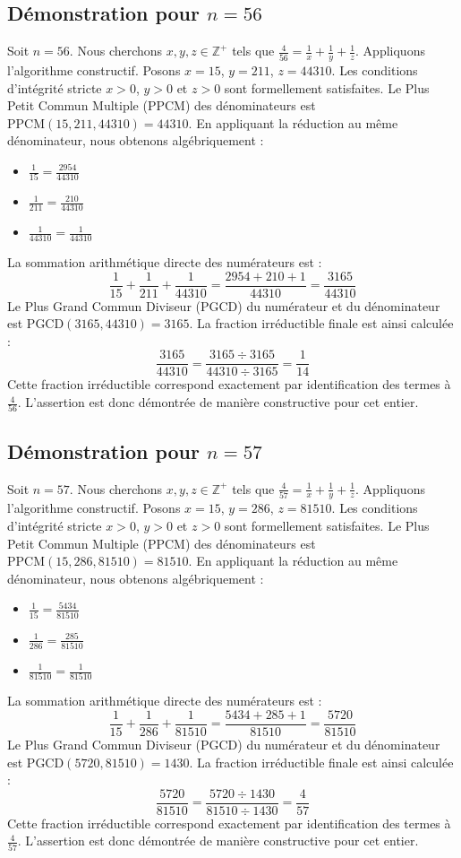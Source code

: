 \documentclass[11pt,a4paper]{article}
\begin{document}
\subsection{Démonstration pour $n = 56$}
Soit $n = 56$. Nous cherchons $x, y, z \in \mathbb{Z}^{+}$ tels que $\frac{4}{56} = \frac{1}{x} + \frac{1}{y} + \frac{1}{z}$.
Appliquons l'algorithme constructif. Posons $x = 15$, $y = 211$, $z = 44310$.
Les conditions d'intégrité stricte $x > 0$, $y > 0$ et $z > 0$ sont formellement satisfaites.
Le Plus Petit Commun Multiple (PPCM) des dénominateurs est $\text{PPCM}(15, 211, 44310) = 44310$.
En appliquant la réduction au même dénominateur, nous obtenons algébriquement :
\begin{itemize}
    \item $\frac{1}{15} = \frac{2954}{44310}$
    \item $\frac{1}{211} = \frac{210}{44310}$
    \item $\frac{1}{44310} = \frac{1}{44310}$
\end{itemize}
La sommation arithmétique directe des numérateurs est :
$$ \frac{1}{15} + \frac{1}{211} + \frac{1}{44310} = \frac{2954 + 210 + 1}{44310} = \frac{3165}{44310} $$
Le Plus Grand Commun Diviseur (PGCD) du numérateur et du dénominateur est $\text{PGCD}(3165, 44310) = 3165$.
La fraction irréductible finale est ainsi calculée :
$$ \frac{3165}{44310} = \frac{3165 \div 3165}{44310 \div 3165} = \frac{1}{14} $$
Cette fraction irréductible correspond exactement par identification des termes à $\frac{4}{56}$. L'assertion est donc démontrée de manière constructive pour cet entier.

\subsection{Démonstration pour $n = 57$}
Soit $n = 57$. Nous cherchons $x, y, z \in \mathbb{Z}^{+}$ tels que $\frac{4}{57} = \frac{1}{x} + \frac{1}{y} + \frac{1}{z}$.
Appliquons l'algorithme constructif. Posons $x = 15$, $y = 286$, $z = 81510$.
Les conditions d'intégrité stricte $x > 0$, $y > 0$ et $z > 0$ sont formellement satisfaites.
Le Plus Petit Commun Multiple (PPCM) des dénominateurs est $\text{PPCM}(15, 286, 81510) = 81510$.
En appliquant la réduction au même dénominateur, nous obtenons algébriquement :
\begin{itemize}
    \item $\frac{1}{15} = \frac{5434}{81510}$
    \item $\frac{1}{286} = \frac{285}{81510}$
    \item $\frac{1}{81510} = \frac{1}{81510}$
\end{itemize}
La sommation arithmétique directe des numérateurs est :
$$ \frac{1}{15} + \frac{1}{286} + \frac{1}{81510} = \frac{5434 + 285 + 1}{81510} = \frac{5720}{81510} $$
Le Plus Grand Commun Diviseur (PGCD) du numérateur et du dénominateur est $\text{PGCD}(5720, 81510) = 1430$.
La fraction irréductible finale est ainsi calculée :
$$ \frac{5720}{81510} = \frac{5720 \div 1430}{81510 \div 1430} = \frac{4}{57} $$
Cette fraction irréductible correspond exactement par identification des termes à $\frac{4}{57}$. L'assertion est donc démontrée de manière constructive pour cet entier.
\end{document}

